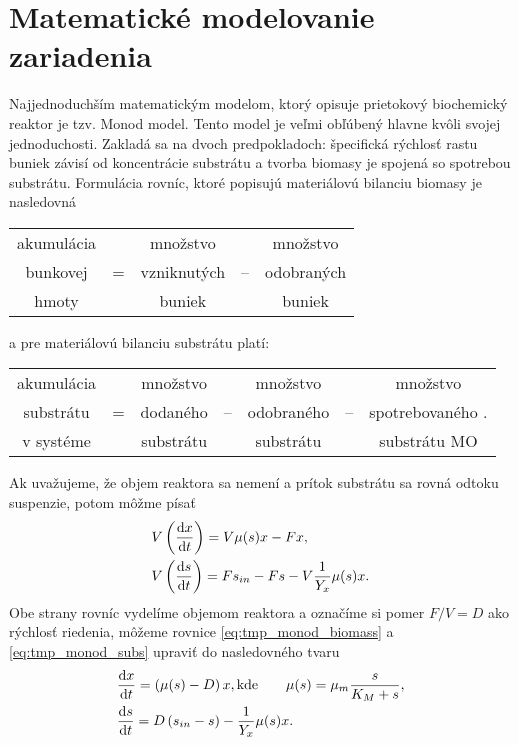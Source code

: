 \section{Matematické modelovanie zariadenia}
Najjednoduchším matematickým modelom, ktorý opisuje prietokový biochemický reaktor je tzv. Monod model. Tento model je veľmi obľúbený hlavne kvôli svojej jednoduchosti. Zakladá sa na dvoch predpokladoch:  špecifická rýchlosť rastu buniek závisí od koncentrácie substrátu a  tvorba biomasy je spojená so spotrebou substrátu. Formulácia rovníc, ktoré popisujú materiálovú bilanciu biomasy je nasledovná
\begin{table}[H]
	\centering
	\begin{tabular}{ccccc}
		akumulácia & & množstvo & & množstvo \\
		bunkovej & = & vzniknutých & -- & odobraných \\
		hmoty & & buniek & & buniek \\
	\end{tabular}
\end{table}
a pre materiálovú bilanciu substrátu platí:
\begin{table}[H]
	\centering
	\begin{tabular}{ccccccc}
		akumulácia & & množstvo & & množstvo & & množstvo\\
		substrátu & = & dodaného & -- & odobraného & -- & spotrebovaného .\\
		v systéme & & substrátu & & substrátu & & substrátu MO\\
	\end{tabular}
\end{table}
Ak uvažujeme, že objem reaktora sa nemení a prítok substrátu sa rovná odtoku suspenzie, potom môžme písať
\begin{align}
	&V\left(\frac{\text{d}x}{\text{d}t}\right) = V\mu(s)x - Fx, \label{eq:tmp_monod_biomass} \\
	&V\left(\frac{\text{d}s}{\text{d}t}\right) = Fs_{in} - Fs - V\frac{1}{Y_{x}}\mu(s)x. \label{eq:tmp_monod_subs}
\end{align}
Obe strany rovníc vydelíme objemom reaktora a označíme si pomer $ F/V = D $ ako rýchlosť riedenia, môžeme rovnice \eqref{eq:tmp_monod_biomass} a \eqref{eq:tmp_monod_subs} upraviť do nasledovného tvaru
\begin{align} 
	&\frac{\text{d}x}{\text{d}t} = \left(\mu(s) - D\right)x, \text{kde}  \qquad \mu(s) = \mu_{m}\frac{s}{K_{M} + s}, \label{eq:monod_biomas}\\
	&\frac{\text{d}s}{\text{d}t} = D\left(s_{in} - s\right) - \frac{1}{Y_{x}}\mu(s)x. \label{eq:monod_subs}
\end{align}

